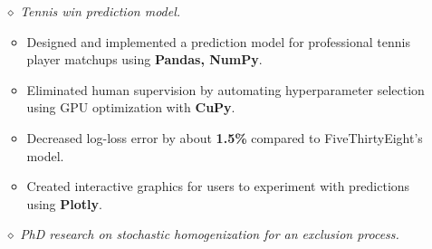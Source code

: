 \documentclass{simplecv}
\begin{document}
\begin{itemize}
  \item[$\diamond$] {\it Tennis win prediction model.} %
  \begin{itemize}
    \item Designed and implemented a prediction model for professional tennis player matchups using {\bf Pandas, NumPy}.
    \item Eliminated human supervision by automating hyperparameter selection using GPU optimization with {\bf CuPy}.
    \item Decreased log-loss error by about {\bf 1.5\%} compared to FiveThirtyEight's model.
    \item Created interactive graphics for users to experiment with predictions using {\bf Plotly}.
  \end{itemize}
  \item[$\diamond$] {\it PhD research on stochastic homogenization for an exclusion process.}  

\end{itemize}
\end{document}
